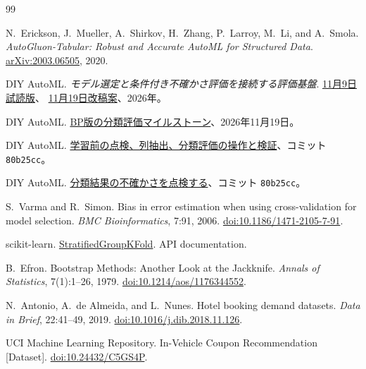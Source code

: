 \newcommand{\record}[2]{\href{https://github.com/okamasaya/DIY_AutoML/blob/80b25cc/#1}{#2}}
\begin{thebibliography}{99}
\small
\raggedright
\setlength{\itemsep}{0.18\baselineskip}
\setlength{\parsep}{0pt}

N.~Erickson, J.~Mueller, A.~Shirkov, H.~Zhang, P.~Larroy, M.~Li, and A.~Smola.
\textit{AutoGluon-Tabular: Robust and Accurate AutoML for Structured Data}.
\href{https://arxiv.org/abs/2003.06505}{arXiv:2003.06505}, 2020.

DIY AutoML.
\textit{モデル選定と条件付き不確かさ評価を接続する評価基盤}.
\href{https://github.com/okamasaya/DIY_AutoML/blob/c45c0b2/docs/letters/DIY_AutoML_Letter_20261109.pdf}{11月9日試読版}、
\href{https://github.com/okamasaya/DIY_AutoML/blob/c45c0b2/docs/letters/DIY_AutoML_Letter_20261119_review.pdf}{11月19日改稿案}、2026年。

DIY AutoML.
\record{docs/BP_CLASSIFICATION_MILESTONE_20261119.md}{BP版の分類評価マイルストーン}、2026年11月19日。

DIY AutoML.
\record{docs/DATA_AUDIT.md}{学習前の点検、列抽出、分類評価の操作と検証}、コミット \texttt{80b25cc}。

DIY AutoML.
\record{docs/SL_UNCERTAINTY_AUDIT.md}{分類結果の不確かさを点検する}、コミット \texttt{80b25cc}。

S.~Varma and R.~Simon.
Bias in error estimation when using cross-validation for model selection.
\textit{BMC Bioinformatics}, 7:91, 2006.
\href{https://doi.org/10.1186/1471-2105-7-91}{doi:10.1186/1471-2105-7-91}.

scikit-learn.
\href{https://scikit-learn.org/stable/modules/generated/sklearn.model_selection.StratifiedGroupKFold.html}{StratifiedGroupKFold}.
API documentation.

B.~Efron.
Bootstrap Methods: Another Look at the Jackknife.
\textit{Annals of Statistics}, 7(1):1--26, 1979.
\href{https://doi.org/10.1214/aos/1176344552}{doi:10.1214/aos/1176344552}.

N.~Antonio, A.~de Almeida, and L.~Nunes.
Hotel booking demand datasets.
\textit{Data in Brief}, 22:41--49, 2019.
\href{https://doi.org/10.1016/j.dib.2018.11.126}{doi:10.1016/j.dib.2018.11.126}.

UCI Machine Learning Repository.
In-Vehicle Coupon Recommendation [Dataset].
\href{https://doi.org/10.24432/C5GS4P}{doi:10.24432/C5GS4P}.


\end{thebibliography}
